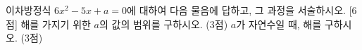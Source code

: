 이차방정식 $6x^2-5x+a=0$에 대하여 다음 물음에 답하고, 그 과정을 서술하시오. \mbox{[6점]}
 해를 가지기 위한 $a$의 값의 범위를 구하시오. (3점)
 $a$가 자연수일 때, 해를 구하시오. (3점)
